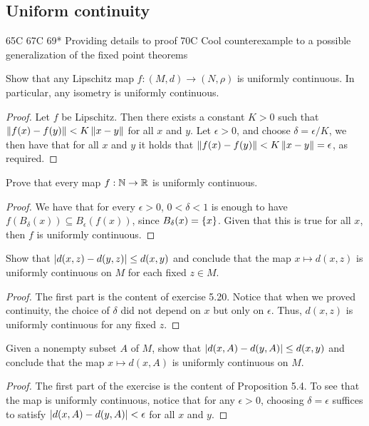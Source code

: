 \subsection{Uniform continuity}

65C
67C
69* Providing details to proof
70C Cool counterexample to a possible generalization of the fixed point theorems

\begin{exercise}{44}
Show that any Lipschitz map $f:(M,d)\to (N,\rho)$ is uniformly continuous. 
In particular, any isometry is uniformly continuous.
\end{exercise}
\begin{proof}
Let $f$ be Lipschitz.
Then there exists a constant $K>0$ such that $\left\lVert f(x)-f(y)\right\rVert < K\left\lVert x-y\right\rVert$ for all $x$ and $y$.
Let $\epsilon >0$, and choose $\delta = \epsilon/K$, we then have that for all $x$ and $y$ it holds that $\left\lVert f(x)-f(y)\right\rVert<K\left\lVert x-y\right\rVert=\epsilon$, as required.
\end{proof} 

\begin{exercise}{45}
Prove that every map $f:\mathbb{N}\to\mathbb{R}$ is uniformly continuous.
\end{exercise}
\begin{proof}
We have that for every $\epsilon>0$, $0<\delta<1$ is enough to have $f(B_\delta(x))\subseteq B_\epsilon(f(x))$, since $B_\delta(x)=\{x\}$.
Given that this is true for all $x$, then $f$ is uniformly continuous.
\end{proof} 

\begin{exercise}{46}
Show that $\left\lvert d(x,z)-d(y,z)\right\rvert \leq d(x,y)$ and conclude that the map $x\mapsto d(x,z)$ is uniformly continuous on $M$ for each fixed $z\in M$.
\end{exercise}
\begin{proof}
The first part is the content of exercise 5.20.
Notice that when we proved continuity, the choice of $\delta$ did not depend on $x$ but only on $\epsilon$.
Thus, $d(x,z)$ is uniformly continuous for any fixed $z$.
\end{proof} 

\begin{exercise}{47}
Given a nonempty subset $A$ of $M$, show that $\left\lvert d(x,A) - d(y,A)\right\rvert \leq d(x,y)$ and conclude that the map $x \mapsto d(x,A)$ is uniformly continuous on $M$.
\end{exercise}
\begin{proof}
The first part of the exercise is the content of Proposition 5.4.
To see that the map is uniformly continuous, notice that for any $\epsilon>0$, choosing $\delta=\epsilon$ suffices to satisfy $\left\lvert d(x,A) - d(y,A)\right\rvert< \epsilon$ for all $x$ and $y$.
\end{proof} 

